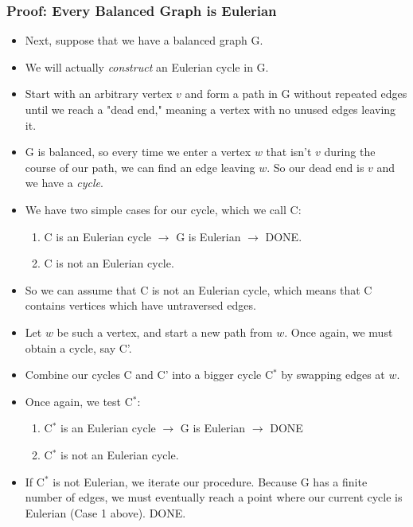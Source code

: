 \documentclass[10pt]{article}
\begin{document}
\subsubsection*{Proof: Every Balanced Graph is Eulerian}
\begin{itemize}
    \item Next, suppose that we have a balanced graph G.
    \item We will actually \textit{construct} an Eulerian cycle in G.
    \item Start with an arbitrary vertex $v$ and form a path in G without repeated edges until we reach a "dead end," meaning a vertex with no unused edges leaving it.
    \item G is balanced, so every time we enter a vertex $w$ that isn't $v$ during the course of our path, we can find an edge leaving $w$.  So our dead end is $v$ and we have a \textit{cycle}.
    \item We have two simple cases for our cycle, which we call C:
    \begin{enumerate}
        \item C is an Eulerian cycle $\rightarrow$ G is Eulerian $\rightarrow$ DONE.
        \item C is not an Eulerian cycle.
    \end{enumerate}
    \item So we can assume that C is not an Eulerian cycle, which means that C contains vertices which have untraversed edges.
    \item Let $w$ be such a vertex, and start a new path from $w$.  Once again, we must obtain a cycle, say C'.
    \item Combine our cycles C and C' into a bigger cycle C$^*$ by swapping edges at $w$.
    \item Once again, we test C$^*$:
    \begin{enumerate}
        \item C$^*$ is an Eulerian cycle $\rightarrow$ G is Eulerian $\rightarrow$ DONE
        \item C$^*$ is not an Eulerian cycle.
    \end{enumerate}
    \item If C$^*$ is not Eulerian, we iterate our procedure.  Because G has a finite number of edges, we must eventually reach a point where our current cycle is Eulerian (Case 1 above).  DONE.
\end{itemize}
\end{document}
